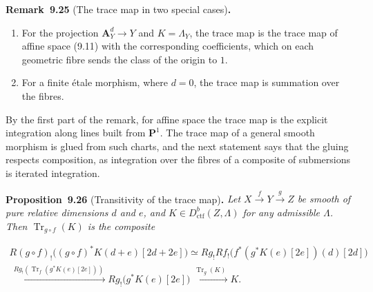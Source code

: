 \documentclass[11pt]{article}
\newenvironment{bpstatement}[2]{\par\addvspace{0.6\baselineskip}\noindent\textbf{#1}#2\textbf{.}\enspace\ignorespaces}
  {\par\addvspace{0.4\baselineskip}}
\newenvironment{bpstatementit}[2]{\begin{bpstatement}{#1}{#2}\itshape\ignorespaces}{\end{bpstatement}}
\begin{document}
\label{bp84}%
\begin{bpstatement}{Remark~9.25}{ (The trace map in two special cases)}
\begin{enumerate}
\item For the projection \(\mathbf A^d_Y\to Y\) and \(K=\Lambda_Y\), the trace map is the trace map of affine space (9.11) with the corresponding coefficients, which on each geometric fibre sends the class of the origin to \(1\).
\item For a finite étale morphism, where \(d=0\), the trace map is summation over the fibres.
\end{enumerate}
\end{bpstatement}

\label{bp85}%
By the first part of the remark, for affine space the trace map is the explicit integration along lines built from \(\mathbf P^1\). The trace map of a general smooth morphism is glued from such charts, and the next statement says that the gluing respects composition, as integration over the fibres of a composite of submersions is iterated integration.

\label{bp86}%
\begin{bpstatementit}{Proposition~9.26}{ (Transitivity of the trace map)}
Let \(X\xrightarrow{f}Y\xrightarrow{g}Z\) be smooth of pure relative dimensions \(d\) and \(e\), and \(K\in D^b_{\mathrm{ctf}}(Z,\Lambda)\) for any admissible \(\Lambda\). Then \(\operatorname{Tr}_{g\circ f}(K)\) is the composite

\[
\begin{gathered}
R(g\circ f)_!
\bigl((g\circ f)^{*}K(d+e)[2d+2e]\bigr)
\simeq Rg_!Rf_!
\bigl(f^{*}
(g^{*}K(e)[2e])(d)[2d]\bigr)\\
\xrightarrow{\ Rg_!
(\operatorname{Tr}_{f}(g^{*}K(e)[2e]))\ }
Rg_!\bigl(g^{*}K(e)[2e]\bigr)
\xrightarrow{\ \operatorname{Tr}_{g}(K)\ }K.
\end{gathered}
\]
\end{bpstatementit}
\end{document}
